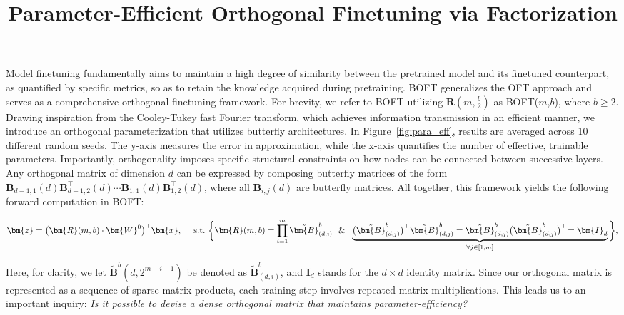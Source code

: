 \title{Parameter-Efficient Orthogonal Finetuning via Factorization}
Model finetuning fundamentally aims to maintain a high degree of similarity between the pretrained model and its finetuned counterpart, as quantified by specific metrics, so as to retain the knowledge acquired during pretraining. BOFT generalizes the OFT approach and serves as a comprehensive orthogonal finetuning framework. For brevity, we refer to BOFT utilizing $\bm{R}(m, \frac{b}{2})$ as BOFT($m$,$b$), where $b \geq 2$. Drawing inspiration from the Cooley-Tukey fast Fourier transform, which achieves information transmission in an efficient manner, we introduce an orthogonal parameterization that utilizes butterfly architectures. In Figure~\ref{fig:para_eff}, results are averaged across 10 different random seeds. The y-axis measures the error in approximation, while the x-axis quantifies the number of effective, trainable parameters. Importantly, orthogonality imposes specific structural constraints on how nodes can be connected between successive layers. Any orthogonal matrix of dimension $d$ can be expressed by composing butterfly matrices of the form $\bm{B}_{d-1,1}(d)\bm{B}^\top_{d-1,2}(d)\cdots\bm{B}_{1,1}(d)\bm{B}^\top_{1,2}(d)$, where all $\bm{B}_{i,j}(d)$ are butterfly matrices. All together, this framework yields the following forward computation in BOFT:

\begin{equation}
    \begin{aligned}\nonumber
    \bm{z}=\big(\bm{R}(m,b)\cdot\bm{W}^0\big)^\top\bm{x},~~~~\text{s.t.}~\bigg{\{}\bm{R}(m,b)=\prod_{i=1}^m \tilde{\bm{B}}^b_{(d,i)}~~\&~~\underbrace{\big(\tilde{\bm{B}}^b_{(d,j)}\big)^\top\tilde{\bm{B}}^b_{(d,j)}=\tilde{\bm{B}}^b_{(d,j)}\big(\tilde{\bm{B}}^b_{(d,j)}\big)^\top\!=\bm{I}_d}_{\forall j\in [1, m]}\bigg{\}},
    \end{aligned}
\end{equation}

Here, for clarity, we let $\tilde{\bm{B}}^b(d,2^{m - i+1})$ be denoted as $\tilde{\bm{B}}^b_{(d,i)}$, and $\bm{I}_d$ stands for the $d \times d$ identity matrix. Since our orthogonal matrix is represented as a sequence of sparse matrix products, each training step involves repeated matrix multiplications. This leads us to an important inquiry: \emph{Is it possible to devise a dense orthogonal matrix that maintains parameter-efficiency?}

